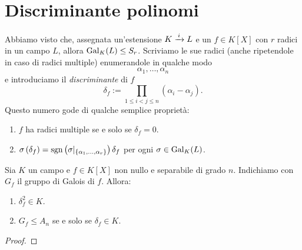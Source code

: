 
\section{Discriminante polinomi}

Abbiamo visto che, assegnata un'estensione \(K \mor i L\) e un \(f \in K[X]\) con \(r\) radici in un campo \(L\), allora \(\Gal[K]L \le S_r\). Scriviamo le sue radici (anche ripetendole in caso di radici multiple) enumerandole in qualche modo
\[\alpha_1, \dots{}, \alpha_n\]
e introduciamo il {\em discriminante} di \(f\)
\[\delta_f := \prod_{1 \le i < j \le n} (\alpha_i - \alpha_j) .\]
Questo numero gode di qualche semplice proprietà:
\begin{enumerate}
\item \(f\) ha radici multiple se e solo se \(\delta_f = 0\).
\item \(\sigma\left(\delta_f\right) = \sgn\left(\sigma|_{\{\alpha_1, \dots, \alpha_r\}}\right) \delta_f\) per ogni \(\sigma \in \Gal[K]L\).
\end{enumerate}

\begin{prop}
Sia \(K\) un campo e \(f \in K[X]\) non nullo e separabile di grado \(n\). Indichiamo con \(G_f\) il gruppo di Galois di \(f\). Allora:
\begin{enumerate}
\item \(\delta_f^2 \in K\).
\item \(G_f \le A_n\) se e solo se \(\delta_f \in K\).
\end{enumerate}
\end{prop}

\begin{proof}
\end{proof}
